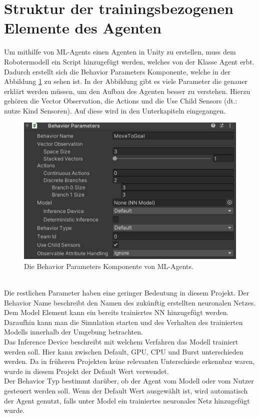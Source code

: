 \newpage
\section{Struktur der trainingsbezogenen Elemente des Agenten}
\label{struktur}
Um mithilfe von ML-Agents einen Agenten in Unity zu erstellen, muss dem Robotermodell ein Script hinzugefügt werden, welches von der Klasse \dq Agent\dq{} erbt. Dadurch erstellt sich die \dq Behavior Parameters\dq{} Komponente, welche in der Abbildung \ref{fig:behavior_para} zu sehen ist. In der Abbildung gibt es viele Parameter die genauer erklärt werden müssen, um den Aufbau des Agenten besser zu verstehen. Hierzu gehören die Vector Observation, die Actions und die Use Child Sensors (dt.: nutze Kind Sensoren). Auf diese wird in den Unterkapiteln eingegangen.
\begin{figure} [ht]
	\centering
	\includegraphics[width=0.6\columnwidth]{img/behavior_parameters}
	\caption[Behavior Parameter Komponente]{Die Behavior Parameters Komponente von ML-Agents.}
	\label{fig:behavior_para}
\end{figure}
\\
Die restlichen Parameter haben eine geringer Bedeutung in diesem Projekt. Der Behavior Name beschreibt den Namen des zukünftig erstellten neuronalen Netzes. 
\\Dem Model Element kann ein bereits trainiertes NN hinzugefügt werden. Daraufhin kann man die Simulation starten und des Verhalten des trainierten Modells innerhalb der Umgebung betrachten. 
\\
Das Inference Device beschreibt mit welchem Verfahren das Modell trainiert werden soll. Hier kann zwischen \dq Default\dq{}, \dq GPU\dq{}, \dq CPU\dq{} und \dq Burst\dq{} unterschieden werden. Da in früheren Projekten keine relevanten Unterschiede erkennbar waren, wurde in diesem Projekt der Default Wert verwendet. 
\\
Der Behavior Typ bestimmt darüber, ob der Agent vom Modell oder vom Nutzer gesteuert werden soll. Wenn der Default Wert ausgewählt ist, wird automatisch der Agent genutzt, falls unter Model ein trainiertes neuronales Netz hinzugefügt wurde. 
